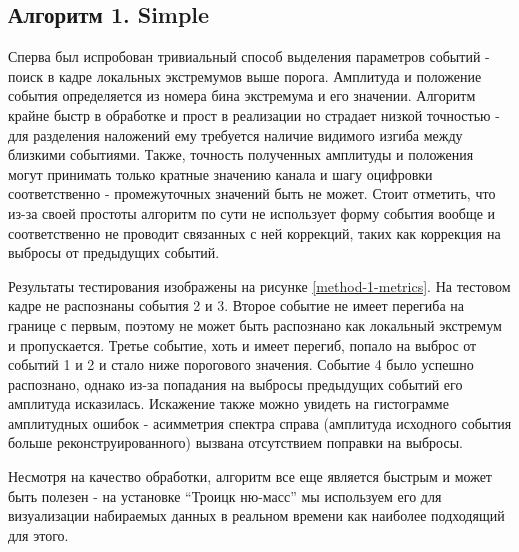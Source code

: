 \documentclass[a4paper,14pt]{extreport}
\begin{document}
\subsection{Алгоритм 1. Simple}
Сперва был испробован тривиальный способ выделения параметров событий - поиск в кадре локальных экстремумов выше порога. Амплитуда и положение события определяется из номера бина экстремума и его значении.
Алгоритм крайне быстр в обработке и прост в реализации но страдает низкой точностью - для разделения наложений ему требуется наличие видимого изгиба между близкими событиями. Также, точность полученных амплитуды и положения могут принимать только кратные значению канала и шагу оцифровки соответственно - промежуточных значений быть не может. Стоит отметить, что из-за своей простоты алгоритм по сути не использует форму события вообще и соответственно не проводит связанных с ней коррекций, таких как коррекция на выбросы от предыдущих событий.

Результаты тестирования изображены на рисунке \ref{method-1-metrics}. На тестовом кадре не распознаны события 2 и 3. Второе событие не имеет перегиба на границе с первым, поэтому не может быть распознано как локальный экстремум и пропускается. Третье событие, хоть и имеет перегиб, попало на выброс от событий 1 и 2 и стало ниже порогового значения. Событие 4 было успешно распознано, однако из-за попадания на выбросы предыдущих событий его амплитуда исказилась. Искажение также можно увидеть на гистограмме амплитудных ошибок - асимметрия спектра справа (амплитуда исходного события больше реконструированного) вызвана отсутствием поправки на выбросы.

Несмотря на качество обработки, алгоритм все еще является быстрым и может быть полезен - на установке “Троицк ню-масс” мы используем его для визуализации набираемых данных в реальном времени как наиболее подходящий для этого.
\end{document}

